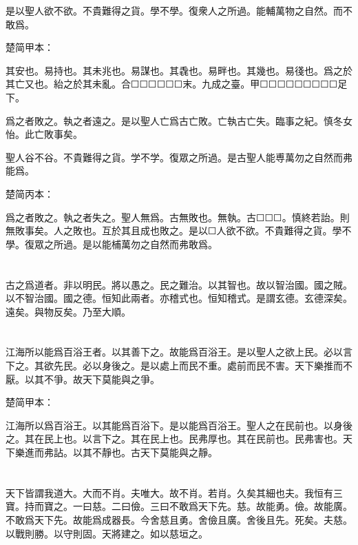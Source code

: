 \documentclass[a5paper]{ctexbook}
\begin{document}
    是以聖人欲不欲。不貴難得之貨。學不學。復衆人之所過。能輔萬物之自然。而不敢爲。

    楚简甲本：

    其安也。易持也。其未兆也。易謀也。其毳也。易畔也。其幾也。易㣤也。爲之於其亡又也。紿之於其未亂。合☐☐☐☐☐☐末。九成之臺。甲☐☐☐☐☐☐☐☐☐足下。

    爲之者敗之。執之者遠之。是以聖人亡爲古亡敗。亡執古亡失。臨事之紀。慎冬女怡。此亡敗事矣。

    聖人谷不谷。不貴難得之貨。学不学。復眾之所過。是古聖人能尃萬勿之自然而弗能爲。

    楚简丙本：

    爲之者敗之。執之者失之。聖人無爲。古無敗也。無執。古☐☐☐。慎終若詒。則無敗事矣。人之敗也。互於其且成也敗之。是以☐人欲不欲。不貴難得之貨。學不學。復眾之所過。是以能㭪萬勿之自然而弗敢爲。

    \chapter{}

    古之爲道者。非以明民。將以愚之。民之難治。以其智也。故以智治國。國之賊。以不智治國。國之德。恒知此兩者。亦稽式也。恒知稽式。是謂玄德。玄德深矣。遠矣。與物反矣。乃至大順。

    \chapter{}

    江海所以能爲百浴王者。以其善下之。故能爲百浴王。是以聖人之欲上民。必以言下之。其欲先民。必以身後之。是以處上而民不重。處前而民不害。天下樂推而不厭。以其不爭。故天下莫能與之爭。

    楚简甲本：

    江海所以爲百浴王。以其能爲百浴下。是以能爲百浴王。聖人之在民前也。以身後之。其在民上也。以言下之。其在民上也。民弗厚也。其在民前也。民弗害也。天下樂進而弗詀。以其不靜也。古天下莫能與之靜。

    \chapter{}

    天下皆謂我道大。大而不肖。夫唯大。故不肖。若肖。久矣其細也夫。我恒有三寶。持而寶之。一曰慈。二曰儉。三曰不敢爲天下先。慈。故能勇。儉。故能廣。不敢爲天下先。故能爲成器長。今舍慈且勇。舍儉且廣。舍後且先。死矣。夫慈。以戰則勝。以守則固。天將建之。如以慈垣之。

    \chapter{}
\end{document}
